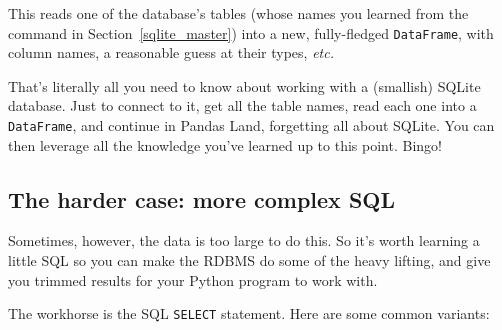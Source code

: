 This reads one of the database's tables (whose names you learned from the
command in Section~\ref{sqlite_master}) into a new, fully-fledged
\texttt{DataFrame}, with column names, a reasonable guess at their types,
\textit{etc.} 

That's literally all you need to know about working with a (smallish) SQLite
database. Just to connect to it, get all the table names, read each one into a
\texttt{DataFrame}, and continue in Pandas Land, forgetting all about SQLite.
You can then leverage all the knowledge you've learned up to this point. Bingo!


\subsection{The harder case: more complex SQL}


Sometimes, however, the data is too large to do this. So it's worth learning a
little SQL so you can make the RDBMS do some of the heavy lifting, and give you
trimmed results for your Python program to work with.


The workhorse is the SQL \texttt{SELECT} statement. Here are some common
variants:

